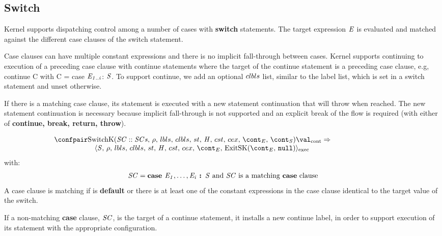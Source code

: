 \documentclass{article}
\begin{document}
\subsection{Switch}
Kernel supports dispatching control among a number of cases with \textbf{switch} statements.
The target expression $\mathit{E}$ is evaluated and matched against the different case clauses of the switch statement.

\noindent
Case clauses can have multiple constant expressions and there is no implicit fall-through between cases.
Kernel supports continuing to execution of a preceding case clause with continue statements where the target of the continue statement is a preceding case clause, e.g, continue C with C = case $\mathit{E}_\mathit{1..i}$: $\mathit{S}$.
To support continue, we add an optional $clbls$ list, similar to the label list, which is set in a switch statement and unset otherwise.

\noindent
If there is a matching case clause, its statement is executed with a new statement continuation that will throw when reached.
The new statement continuation is necessary because implicit fall-through is not supported and an explicit break of the flow is required (with either of \textbf{continue, break, return, throw}).

\[
  \begin{array}{lcl}
	\contconf{\SwitchK{\scase :: \scases}{\clbls}}{\val}
	\Rightarrow \hspace{30mm}\\
	\hspace{20mm}\execconf{\stmt}{\env}{\lbls}{\clbls}{\handler}{\cstrace}{\cex}{\econt}{\ExitSK{\tt{null}}}
  \end{array}
\]
with:
\[
	\mathit{SC} = \textbf{case } \mathit{E}_\mathit{1}, \dots, \mathit{E}_\mathit{i} \textbf{ : } \mathit{S} \textrm{ and } \mathit{SC} \textrm{ is a matching \textbf{case} clause}
\]
A case clause is matching if is \textbf{default} or there is at least one of the constant expressions in the case clause identical to the target value of the switch.

\noindent
If a non-matching \textbf{case} clause, $\mathit{SC}$, is the target of a continue statement, it installs a new continue label, in order to support execution of its statement with the appropriate configuration.
\end{document}

